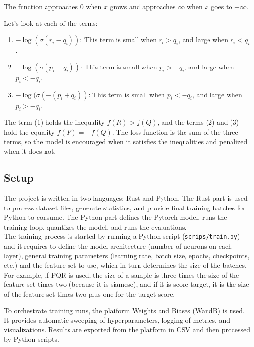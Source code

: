 The function approaches 0 when $x$ grows and approaches $\infty$ when $x$ goes to $-\infty$.

Let's look at each of the terms:

\begin{enumerate}
\itemsep0em
\item $-\log(\sigma(r_i - q_i))$: This term is small when $r_i > q_i$, and large when $r_i < q_i$.
\item $-\log(\sigma(p_i + q_i))$: This term is small when $p_i > -q_i$, and large when $p_i < -q_i$.
\item $-\log(\sigma(-(p_i + q_i))$: This term is small when $p_i < -q_i$, and large when $p_i > -q_i$.
\end{enumerate}

The term (1) holds the inequality $f(R) > f(Q)$, and the terms (2) and (3) hold the equality $f(P) = -f(Q)$. The loss function is the sum of the three terms, so the model is encouraged when it satisfies the inequalities and penalized when it does not.

\subsection{Setup}


The project is written in two languages: Rust and Python. The Rust part is used to process dataset files, generate statistics, and provide final training batches for Python to consume. The Python part defines the Pytorch model, runs the training loop, quantizes the model, and runs the evaluations. \\

The training process is started by running a Python script (\texttt{scrips/train.py}) and it requires to define the model architecture (number of neurons on each layer), general training parameters (learning rate, batch size, epochs, checkpoints, etc.) and the feature set to use, which in turn determines the size of the batches. For example, if PQR is used, the size of a sample is three times the size of the feature set times two (because it is siamese), and if it is score target, it is the size of the feature set times two plus one for the target score.

To orchestrate training runs, the platform Weights and Biases (WandB) is used. It provides automatic sweeping of hyperparameters, logging of metrics, and visualizations. Results are exported from the platform in CSV and then processed by Python scripts. \\

